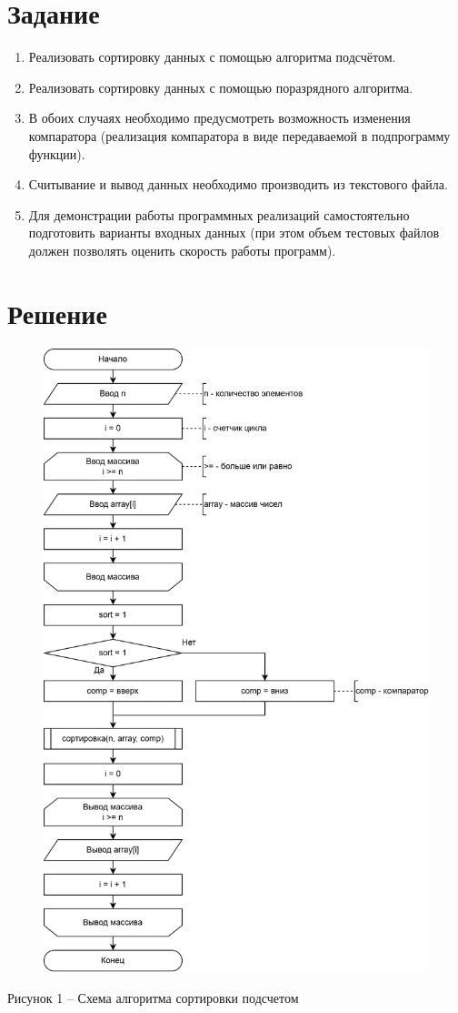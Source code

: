 \documentclass[a4paper,14pt]{extarticle}
\begin{document}
	\section*{Задание}
	\begin{enumerate}
		\item Реализовать сортировку данных с помощью алгоритма подсчётом.
		
		\item Реализовать сортировку данных с помощью поразрядного алгоритма.
		
		\item В обоих случаях необходимо предусмотреть возможность изменения компаратора (реализация компаратора в виде передаваемой в подпрограмму функции).
		
		\item Считывание и вывод данных необходимо производить из текстового файла.
		
		\item Для демонстрации работы программных реализаций самостоятельно подготовить варианты входных данных (при этом объем тестовых файлов должен позволять оценить скорость работы программ).
	\end{enumerate}
	
	\pagebreak
	\section*{Решение}

	\begin{figure}[h]
		\centering
		\includegraphics[width=0.7\linewidth]{images/s-1-1}
	\end{figure}
	\begin{center}
		Рисунок 1 – Схема алгоритма сортировки подсчетом
	\end{center}
\end{document}
